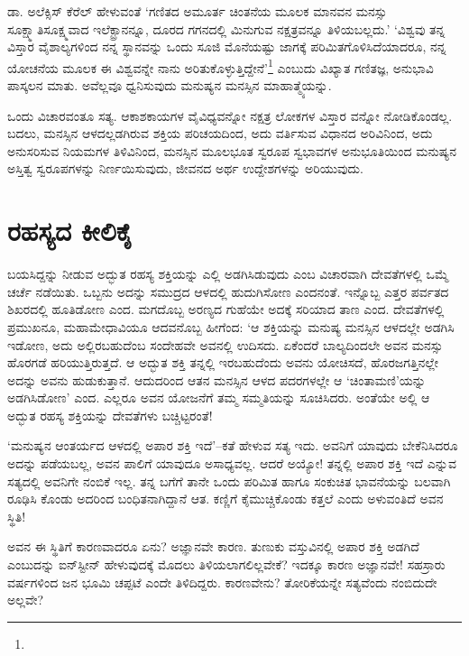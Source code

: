ಡಾ. ಅಲೆಕ್ಸಿಸ್ ಕೆರೆಲ್​ ಹೇಳುವಂತೆ ‘ಗಣಿತದ ಅಮೂರ್ತ ಚಿಂತನೆಯ ಮೂಲಕ ಮಾನವನ ಮನಸ್ಸು ಸೂಕ್ಷ್ಮಾತಿಸೂಕ್ಷ್ಮವಾದ ಇಲೆಕ್ಟ್ರಾನನ್ನೂ, ದೂರದ ಗಗನದಲ್ಲಿ ಮಿನುಗುವ ನಕ್ಷತ್ರವನ್ನೂ ತಿಳಿಯಬಲ್ಲದು.’ ‘ವಿಶ್ವವು ತನ್ನ ವಿಸ್ತಾರ ವೈಶಾಲ್ಯಗಳಿಂದ ನನ್ನ ಸ್ಥಾನವನ್ನು ಒಂದು ಸೂಜಿ ಮೊನೆಯಷ್ಟು ಜಾಗಕ್ಕೆ ಪರಿಮಿತಗೊಳಿಸಿದೆಯಾದರೂ, ನನ್ನ ಯೋಚನೆಯ ಮೂಲಕ ಈ ವಿಶ್ವವನ್ನೇ ನಾನು ಅರಿತುಕೊಳ್ಳುತ್ತಿದ್ದೇನೆ’\footnote{\hfill{}} ಎಂಬುದು ವಿಖ್ಯಾತ ಗಣಿತಜ್ಞ, ಅನುಭಾವಿ ಪಾಸ್ಕಲನ ಮಾತು. ಅವೆಲ್ಲವೂ ಧ್ವನಿಸುವುದು ಮನುಷ್ಯನ ಮನಸ್ಸಿನ ಮಾಹಾತ್ಮ್ಯೆಯನ್ನು.

\newpage

ಒಂದು ವಿಚಾರವಂತೂ ಸತ್ಯ. ಆಕಾಶಕಾಯಗಳ ವೈವಿಧ್ಯವನ್ನೋ ನಕ್ಷತ್ರ ಲೋಕಗಳ ವಿಸ್ತಾರ ವನ್ನೋ ನೋಡಿಕೊಂಡಲ್ಲ. ಬದಲು, ಮನಸ್ಸಿನ ಆಳದಲ್ಲಡಗಿರುವ ಶಕ್ತಿಯ ಪರಿಚಯದಿಂದ, ಅದು ವರ್ತಿಸುವ ವಿಧಾನದ ಅರಿವಿನಿಂದ, ಅದು ಅನುಸರಿಸುವ ನಿಯಮಗಳ ತಿಳಿವಿನಿಂದ, ಮನಸ್ಸಿನ ಮೂಲಭೂತ ಸ್ವರೂಪ ಸ್ವಭಾವಗಳ ಅನುಭೂತಿಯಿಂದ ಮನುಷ್ಯನ ಅಸ್ತಿತ್ವ ಸ್ವರೂಪಗಳನ್ನು ನಿರ್ಣಯಿಸುವುದು, ಜೀವನದ ಅರ್ಥ ಉದ್ದೇಶಗಳನ್ನು ಅರಿಯುವುದು.


\section*{ರಹಸ್ಯದ ಕೀಲಿಕೈ}


ಬಯಸಿದ್ದನ್ನು ನೀಡುವ ಅದ್ಭುತ ರಹಸ್ಯ ಶಕ್ತಿಯನ್ನು ಎಲ್ಲಿ ಅಡಗಿಸಿಡುವುದು ಎಂಬ ವಿಚಾರವಾಗಿ ದೇವತೆಗಳಲ್ಲಿ ಒಮ್ಮೆ ಚರ್ಚೆ ನಡೆಯಿತು. ಒಬ್ಬನು ಅದನ್ನು ಸಮುದ್ರದ ಆಳದಲ್ಲಿ ಹುದುಗಿಸೋಣ ಎಂದನಂತೆ. ಇನ್ನೊಬ್ಬ ಎತ್ತರ ಪರ್ವತದ ಶಿಖರದಲ್ಲಿ ಹೂತಿಡೋಣ ಎಂದ. ಮಗದೊಬ್ಬ ಅರಣ್ಯದ ಗುಹೆಯೇ ಅದಕ್ಕೆ ಸರಿಯಾದ ತಾಣ ಎಂದ. ದೇವತೆಗಳಲ್ಲಿ ಪ್ರಮುಖನೂ, ಮಹಾಮೇಧಾವಿಯೂ ಆದವನೊಬ್ಬ ಹೀಗೆಂದ: ‘ಆ ಶಕ್ತಿಯನ್ನು ಮನುಷ್ಯ ಮನಸ್ಸಿನ ಆಳದಲ್ಲೇ ಅಡಗಿಸಿ ಇಡೋಣ, ಅದು ಅಲ್ಲಿರಬಹುದೆಂಬ ಸಂದೇಹವೇ ಅವನಲ್ಲಿ ಉದಿಸದು. ಏಕೆಂದರೆ ಬಾಲ್ಯದಿಂದಲೇ ಅವನ ಮನಸ್ಸು ಹೊರಗಡೆ ಹರಿಯುತ್ತಿರುತ್ತದೆ. ಆ ಅದ್ಭುತ ಶಕ್ತಿ ತನ್ನಲ್ಲಿ ಇರಬಹುದೆಂದು ಅವನು ಯೋಚಿಸದೆ, ಹೊರಜಗತ್ತಿನಲ್ಲೇ ಅದನ್ನು ಅವನು ಹುಡುಕುತ್ತಾನೆ. ಆದುದರಿಂದ ಆತನ ಮನಸ್ಸಿನ ಆಳದ ಪದರಗಳಲ್ಲೇ ಆ ‘ಚಿಂತಾಮಣಿ’ಯನ್ನು ಅಡಗಿಸಿಡೋಣ’ ಎಂದ. ಎಲ್ಲರೂ ಅವನ ಯೋಜನೆಗೆ ತಮ್ಮ ಸಮ್ಮತಿಯನ್ನು ಸೂಚಿಸಿದರು. ಅಂತೆಯೇ ಅಲ್ಲಿ ಆ ಅದ್ಭುತ ರಹಸ್ಯ ಶಕ್ತಿಯನ್ನು ದೇವತೆಗಳು ಬಚ್ಚಿಟ್ಟರಂತೆ!

‘ಮನುಷ್ಯನ ಆಂತರ್ಯದ ಆಳದಲ್ಲಿ ಅಪಾರ ಶಕ್ತಿ ಇದೆ’–ಕತೆ ಹೇಳುವ ಸತ್ಯ ಇದು. ಅವನಿಗೆ ಯಾವುದು ಬೇಕೆನಿಸಿದರೂ ಅದನ್ನು ಪಡೆಯಬಲ್ಲ, ಅವನ ಪಾಲಿಗೆ ಯಾವುದೂ ಅಸಾಧ್ಯವಲ್ಲ. ಆದರೆ ಅಯ್ಯೋ! ತನ್ನಲ್ಲಿ ಅಪಾರ ಶಕ್ತಿ ಇದೆ ಎನ್ನುವ ಸತ್ಯದಲ್ಲಿ ಅವನಿಗೇ ನಂಬಿಕೆ ಇಲ್ಲ. ತನ್ನ ಬಗೆಗೆ ತಾನೇ ಒಂದು ಪರಿಮಿತ ಹಾಗೂ ಸಂಕುಚಿತ ಭಾವನೆಯನ್ನು ಬಲವಾಗಿ ರೂಢಿಸಿ ಕೊಂಡು ಅದರಿಂದ ಬಂಧಿತನಾಗಿದ್ದಾನೆ ಆತ. ಕಣ್ಣಿಗೆ ಕೈಮುಚ್ಚಿಕೊಂಡು ಕತ್ತಲೆ ಎಂದು ಅಳುವಂತಿದೆ ಅವನ ಸ್ಥಿತಿ!

ಅವನ ಈ ಸ್ಥಿತಿಗೆ ಕಾರಣವಾದರೂ ಏನು? ಅಜ್ಞಾನವೇ ಕಾರಣ. ತುಣುಕು ವಸ್ತುವಿನಲ್ಲಿ ಅಪಾರ ಶಕ್ತಿ ಅಡಗಿದೆ ಎಂಬುದನ್ನು ಐನ್​ಸ್ಟೀನ್ ಹೇಳುವುದಕ್ಕೆ ಮೊದಲು ತಿಳಿಯಲಾಗಲಿಲ್ಲವೇಕೆ? ಇದಕ್ಕೂ ಕಾರಣ ಅಜ್ಞಾನವೇ! ಸಹಸ್ರಾರು ವರ್ಷಗಳಿಂದ ಜನ ಭೂಮಿ ಚಪ್ಪಟೆ ಎಂದೇ ತಿಳಿದಿದ್ದರು. ಕಾರಣವೇನು? ತೋರಿಕೆಯನ್ನೇ ಸತ್ಯವೆಂದು ನಂಬಿದುದೇ ಅಲ್ಲವೇ?

